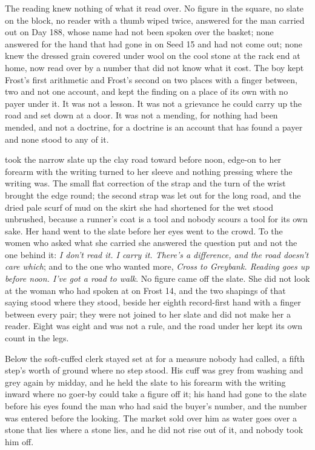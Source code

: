 The reading knew nothing of what it read over. No figure in the square, no slate on the block, no reader with a thumb wiped twice, answered for the man carried out on Day 188, whose name had not been spoken over the basket; none answered for the hand that had gone in on Seed 15 and had not come out; none knew the dressed grain covered under wool on the cool stone at the rack end at home, now read over by a number that did not know what it cost. The boy kept Frost's first arithmetic and Frost's second on two places with a finger between, two and not one account, and kept the finding on a place of its own with no payer under it. It was not a lesson. It was not a grievance he could carry up the road and set down at a door. It was not a mending, for nothing had been mended, and not a doctrine, for a doctrine is an account that has found a payer and none stood to any of it.

 took the narrow slate up the clay road toward  before noon, edge-on to her forearm with the writing turned to her sleeve and nothing pressing where the writing was. The small flat correction of the strap and the turn of the wrist brought the edge round; the second strap was let out for the long road, and the dried pale scurf of mud on the skirt she had shortened for the wet stood unbrushed, because a runner's coat is a tool and nobody scours a tool for its own sake. Her hand went to the slate before her eyes went to the crowd. To the women who asked what she carried she answered the question put and not the one behind it: \emph{I don't read it. I carry it. There's a difference, and the road doesn't care which}; and to the one who wanted more, \emph{Cross to Greybank. Reading goes up before noon. I've got a road to walk}. No figure came off the slate. She did not look at the woman who had spoken at  on Frost 14, and the two shapings of that saying stood where they stood, beside her eighth record-first hand with a finger between every pair; they were not joined to her slate and did not make her a reader. Eight was eight and was not a rule, and the road under her kept its own count in the legs.

Below  the soft-cuffed clerk stayed set at  for a measure nobody had called, a fifth step's worth of ground where no step stood. His cuff was grey from washing and grey again by midday, and he held the slate to his forearm with the writing inward where no goer-by could take a figure off it; his hand had gone to the slate before his eyes found the man who had said the buyer's number, and the number was entered before the looking. The market sold over him as water goes over a stone that lies where a stone lies, and he did not rise out of it, and nobody took him off.

